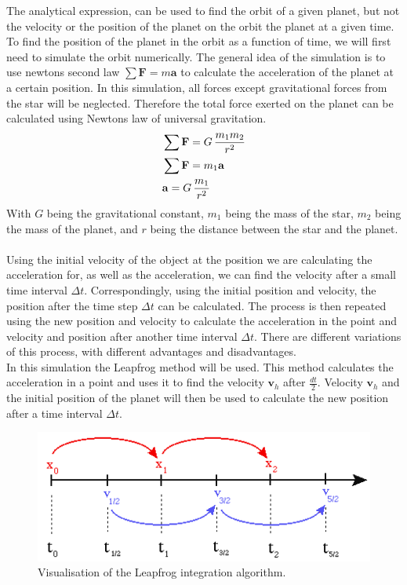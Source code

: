 \documentclass[reprint,english,notitlepage]{revtex4-2}
\begin{document}
The analytical expression, can be used to find the orbit of a given planet, but not the velocity or the position of the planet on the orbit the planet at a given time.
To find the position of the planet in the orbit as a function of time, we will first need to simulate the orbit numerically.
The general idea of the simulation is to use newtons second law $\sum\textbf{F} = m\textbf{a}$ to calculate the acceleration of the planet at a certain position.
In this simulation, all forces except gravitational forces from the star will be neglected.
Therefore the total force exerted on the planet can be calculated using Newtons law of universal gravitation.
\begin{align*}
    &\sum\textbf{F} = G\,\frac{m_1 m_2}{r^2} \label{Newton_Grav_law}\\
	&\sum\textbf{F} = m_1 \textbf{a}\\
	&\bold{a} = G\,\frac{m_1}{r^2}
\end{align*}
With $G$ being the gravitational constant, $m_1$ being the mass of the star, $m_2$ being the mass of the planet, and $r$ being the distance between the star and the planet.\\\\
Using the initial velocity of the object at the position we are calculating the acceleration for, as well as the acceleration, we can find the velocity after a small time interval $\Delta t$.
Correspondingly, using the initial position and velocity, the position after the time step $\Delta t$ can be calculated.
The process is then repeated using the new position and velocity to calculate the acceleration in the point and velocity and position after another time interval $\Delta t$.
There are different variations of this process, with different advantages and disadvantages.\\
In this simulation the Leapfrog method will be used.
This method calculates the acceleration in a point and uses it to find the velocity $\textbf{v}_h$ after $ \frac{dt}{2}$.
Velocity $\textbf{v}_h$ and the initial position of the planet will then be used to calculate the new position after a time interval $\Delta t$.\newline
\begin{figure}[h]
	\centering
	\includegraphics[scale=0.4]{Figures/leapfrog1}
	\caption{Visualisation of the Leapfrog integration algorithm.~\parencite[][]{leapfrog}
	}\label{fig:Leapfrog_vis}
\end{figure}\newline
\end{document}
